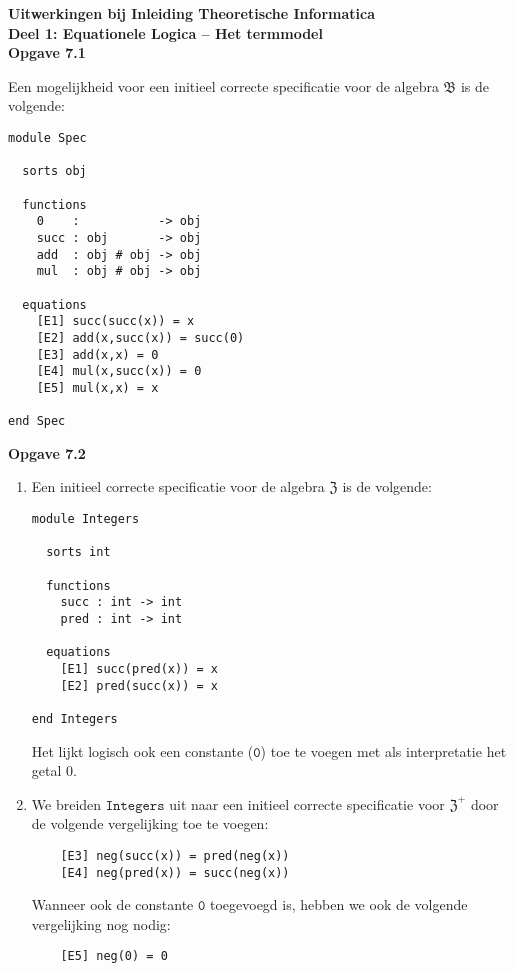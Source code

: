 \documentclass[a4paper,11pt]{article}
\begin{document}
{\bf Uitwerkingen bij Inleiding Theoretische Informatica\\
Deel 1: Equationele Logica -- Het termmodel}\\[2em]


{\bf Opgave 7.1}

Een mogelijkheid voor een initieel correcte specificatie voor de algebra
$\mathfrak{B}$ is de volgende:
\begin{verbatim}
module Spec

  sorts obj

  functions
    0    :           -> obj
    succ : obj       -> obj
    add  : obj # obj -> obj
    mul  : obj # obj -> obj

  equations
    [E1] succ(succ(x)) = x
    [E2] add(x,succ(x)) = succ(0)
    [E3] add(x,x) = 0
    [E4] mul(x,succ(x)) = 0
    [E5] mul(x,x) = x

end Spec
\end{verbatim}


{\bf Opgave 7.2}

\begin{enumerate}

\item %

Een initieel correcte specificatie voor de algebra $\mathfrak{Z}$ is de
volgende:
\begin{verbatim}
module Integers

  sorts int

  functions
    succ : int -> int
    pred : int -> int

  equations
    [E1] succ(pred(x)) = x
    [E2] pred(succ(x)) = x

end Integers
\end{verbatim}
Het lijkt logisch ook een constante ($\texttt{0}$) toe te voegen met als
interpretatie het getal 0.

\item %

We breiden $\texttt{Integers}$ uit naar een initieel correcte specificatie
voor $\mathfrak{Z}^{+}$ door de volgende vergelijking toe te voegen:
\begin{verbatim}
    [E3] neg(succ(x)) = pred(neg(x))
    [E4] neg(pred(x)) = succ(neg(x))
\end{verbatim}
Wanneer ook de constante $\texttt{0}$ toegevoegd is, hebben we ook de volgende
vergelijking nog nodig:
\begin{verbatim}
    [E5] neg(0) = 0
\end{verbatim}

\end{enumerate}
\end{document}
